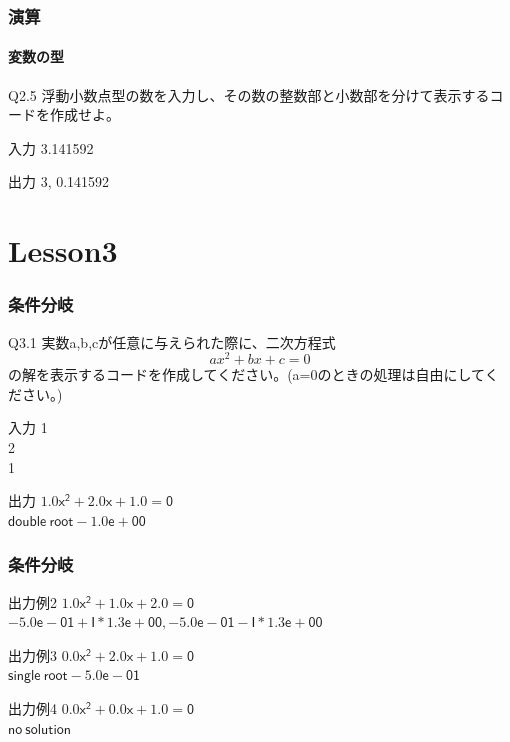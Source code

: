 \documentclass[dvipdfmx]{beamer}
\begin{document}
\begin{frame}
    \frametitle{演算}
    \framesubtitle{変数の型}
	\begin{itembox}[l]{Q2.5}
        浮動小数点型の数を入力し、その数の整数部と小数部を分けて表示するコードを作成せよ。
	\end{itembox}
	\begin{block}{入力}
        3.141592
	\end{block}
	\begin{block}{出力}
        3, 0.141592
	\end{block}
\end{frame}

\section{Lesson3}
\begin{frame}
	\frametitle{条件分岐}
	\begin{itembox}[l]{Q3.1}
		実数a,b,cが任意に与えられた際に、二次方程式
		$$ax^2+bx+c=0$$
		の解を表示するコードを作成してください。(a=0のときの処理は自由にしてください。)
	\end{itembox}
	\begin{block}{入力}
    1\\
    2\\
    1
	\end{block}
	\begin{block}{出力}
		$\mathsf{1.0x^2 + 2.0x + 1.0 = 0}$\\
		$\mathsf{double \ root -1.0e+00}$
	\end{block}
\end{frame}

\begin{frame}
	\frametitle{条件分岐}
	\begin{block}{出力例2}
		$\mathsf{1.0x^2 + 1.0x + 2.0 = 0}$\\
		$\mathsf{-5.0e-01 + I * 1.3e+00, -5.0e-01 - I * 1.3e+00}$
	\end{block}
	\begin{block}{出力例3}
	$\mathsf{0.0x^2 + 2.0x + 1.0 = 0}$\\
	$\mathsf{single \ root -5.0e-01}$
	\end{block}
	\begin{block}{出力例4}
		$\mathsf{0.0x^2 + 0.0x + 1.0 = 0}$\\
		$\mathsf{no\ solution}$
	\end{block}
\end{frame}
\end{document}
